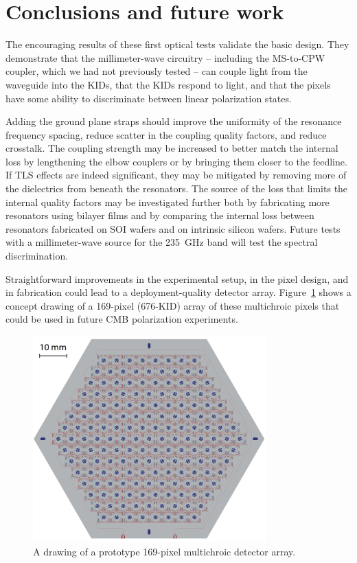 \section{Conclusions and future work}
\label{sec:multichroic:future}

The encouraging results of these first optical tests validate the basic design.
They demonstrate that the millimeter-wave circuitry -- including the MS-to-CPW coupler, which we had not previously tested -- can couple light from the waveguide into the KIDs, that the KIDs respond to light, and that the pixels have some ability to discriminate between linear polarization states.

Adding the ground plane straps should improve the uniformity of the resonance frequency spacing, reduce scatter in the coupling quality factors, and reduce crosstalk.
The coupling strength may be increased to better match the internal loss by lengthening the elbow couplers or by bringing them closer to the feedline. 
If TLS effects are indeed significant, they may be mitigated by removing more of the dielectrics from beneath the resonators.
The source of the loss that limits the internal quality factors may be investigated further both by fabricating more resonators using bilayer films and by comparing the internal loss between resonators fabricated on SOI wafers and on intrinsic silicon wafers.
Future tests with a millimeter-wave source for the \SI{235}{GHz} band will test the spectral discrimination.

Straightforward improvements in the experimental setup, in the pixel design, and in fabrication could lead to a deployment-quality detector array.
Figure~\ref{fig:multichroic_hex_array} shows a concept drawing of a 169-pixel (676-KID) array of these multichroic pixels that could be used in future CMB polarization experiments.


\begin{figure}[htb]
\centering
\includegraphics[width=0.8\textwidth]{multichroic/multichroic_hex_array.png}
\caption[A drawing of a prototype 169-pixel multichroic detector array.]
{
A drawing of a prototype 169-pixel multichroic detector array.
}
\label{fig:multichroic_hex_array}
\end{figure}
